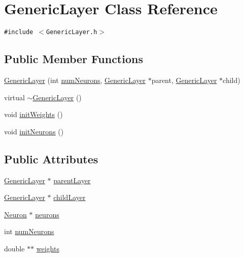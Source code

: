 \hypertarget{classGenericLayer}{
\section{Generic\-Layer Class Reference}
\label{classGenericLayer}
}
{\tt \#include $<$Generic\-Layer.h$>$}

\subsection*{Public Member Functions}
\begin{CompactItemize}
\item 
\hyperlink{classGenericLayer_03c284e00a6a3e261665f46dff41a9ea}{Generic\-Layer} (int \hyperlink{classGenericLayer_7b45631903aa50e67fe5a1947fc292bd}{num\-Neurons}, \hyperlink{classGenericLayer}{Generic\-Layer} $\ast$parent, \hyperlink{classGenericLayer}{Generic\-Layer} $\ast$child)
\item 
virtual \hyperlink{classGenericLayer_3abc382b20bf9585dbba35bb325fff90}{$\sim$Generic\-Layer} ()
\item 
void \hyperlink{classGenericLayer_2e2e170339c48bbcfe05afe9a1f60e43}{init\-Weights} ()
\item 
void \hyperlink{classGenericLayer_c9357145e80d180b812df7bddeb5139d}{init\-Neurons} ()
\end{CompactItemize}
\subsection*{Public Attributes}
\begin{CompactItemize}
\item 
\hyperlink{classGenericLayer}{Generic\-Layer} $\ast$ \hyperlink{classGenericLayer_f936bd9ef0690287bf7ce9fdddaec09d}{parent\-Layer}
\item 
\hyperlink{classGenericLayer}{Generic\-Layer} $\ast$ \hyperlink{classGenericLayer_1eb75b8a4e3951ae983f801bb1d8c478}{child\-Layer}
\item 
\hyperlink{classNeuron}{Neuron} $\ast$ \hyperlink{classGenericLayer_2464f709af50f9def120c1978ed68f24}{neurons}
\item 
int \hyperlink{classGenericLayer_7b45631903aa50e67fe5a1947fc292bd}{num\-Neurons}
\item 
double $\ast$$\ast$ \hyperlink{classGenericLayer_e75dc38537415bb12a60fbbbbb4b3d75}{weights}
\end{CompactItemize}


